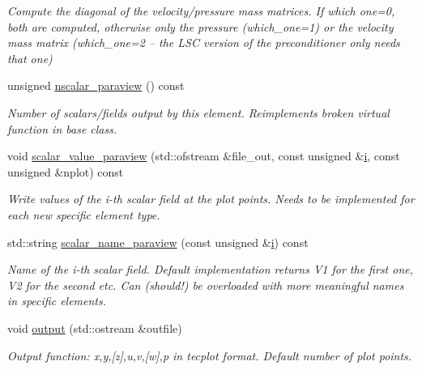 \begin{DoxyCompactItemize}
\begin{DoxyCompactList}\small\item\em Compute the diagonal of the velocity/pressure mass matrices. If which one=0, both are computed, otherwise only the pressure (which\+\_\+one=1) or the velocity mass matrix (which\+\_\+one=2 -- the L\+SC version of the preconditioner only needs that one) \end{DoxyCompactList}\item 
unsigned \hyperlink{classoomph_1_1NavierStokesEquations_a00a118bdb452a5caceeb605ad9db22cd}{nscalar\+\_\+paraview} () const
\begin{DoxyCompactList}\small\item\em Number of scalars/fields output by this element. Reimplements broken virtual function in base class. \end{DoxyCompactList}\item 
void \hyperlink{classoomph_1_1NavierStokesEquations_a5fbd9f03b5b658197cbb773a717f252b}{scalar\+\_\+value\+\_\+paraview} (std\+::ofstream \&file\+\_\+out, const unsigned \&\hyperlink{cfortran_8h_adb50e893b86b3e55e751a42eab3cba82}{i}, const unsigned \&nplot) const
\begin{DoxyCompactList}\small\item\em Write values of the i-\/th scalar field at the plot points. Needs to be implemented for each new specific element type. \end{DoxyCompactList}\item 
std\+::string \hyperlink{classoomph_1_1NavierStokesEquations_afa71f5c316ebc4a76df5dc483b57a21d}{scalar\+\_\+name\+\_\+paraview} (const unsigned \&\hyperlink{cfortran_8h_adb50e893b86b3e55e751a42eab3cba82}{i}) const
\begin{DoxyCompactList}\small\item\em Name of the i-\/th scalar field. Default implementation returns V1 for the first one, V2 for the second etc. Can (should!) be overloaded with more meaningful names in specific elements. \end{DoxyCompactList}\item 
void \hyperlink{classoomph_1_1NavierStokesEquations_ae2c8742419aae8961eb34dad989c69b9}{output} (std\+::ostream \&outfile)
\begin{DoxyCompactList}\small\item\em Output function\+: x,y,\mbox{[}z\mbox{]},u,v,\mbox{[}w\mbox{]},p in tecplot format. Default number of plot points. \end{DoxyCompactList}\item 

\end{DoxyCompactItemize}
